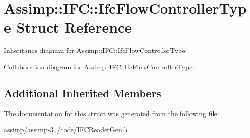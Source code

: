 \hypertarget{struct_assimp_1_1_i_f_c_1_1_ifc_flow_controller_type}{\section{Assimp\+:\+:I\+F\+C\+:\+:Ifc\+Flow\+Controller\+Type Struct Reference}
\label{struct_assimp_1_1_i_f_c_1_1_ifc_flow_controller_type}
}


Inheritance diagram for Assimp\+:\+:I\+F\+C\+:\+:Ifc\+Flow\+Controller\+Type\+:


Collaboration diagram for Assimp\+:\+:I\+F\+C\+:\+:Ifc\+Flow\+Controller\+Type\+:
\subsection*{Additional Inherited Members}


The documentation for this struct was generated from the following file\+:\begin{DoxyCompactItemize}
\item 
assimp/assimp-\/3../code/I\+F\+C\+Reader\+Gen.\+h\end{DoxyCompactItemize}
